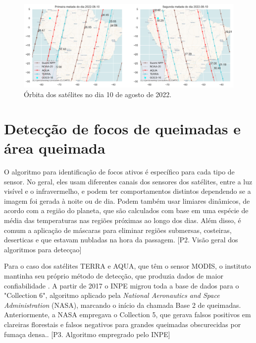 \documentclass[cic,tc]{iiufrgs}
\begin{document}
\begin{figure}[H]
    \caption{Órbita dos satélites no dia 10 de agosto de 2022.}
    \begin{center}
        \includegraphics[width=35em]{orbita2022-08-10}
    \end{center}
    \label{fig:orbita2022-08-10}
\end{figure}

\section{Detecção de focos de queimadas e área queimada}
\label{deteccao_focos_section}

O algoritmo para identificação de focos ativos é específico para cada tipo de sensor. No geral, eles usam diferentes canais dos sensores dos satélites, entre a luz visível e o infravermelho, e podem ter comportamentos distintos dependendo se a imagem foi gerada à noite ou de dia. Podem também usar limiares dinâmicos, de acordo com a região do planeta, que são calculados com base em uma espécie de média das temperaturas nas regiões próximas ao longo dos dias. Além disso, é comum a aplicação de máscaras para eliminar regiões submersas, costeiras, deserticas e que estavam nubladas na hora da passagem. [P2. Visão geral dos algoritmos para detecçao] \par

Para o caso dos satélites TERRA e AQUA, que têm o sensor MODIS, o instituto mantinha seu próprio método de detecção, que produzia dados de maior confiabilidade \citep{PerguntasFrequentesINPE}. A partir de 2017 o INPE migrou toda a base de dados para o "Collection 6", algoritmo aplicado pela \textit{National Aeronautics and Space Administration} (NASA), marcando o início da chamada Base 2 de queimadas. Anteriormente, a NASA empregava o Collection 5, que gerava falsos positivos em clareiras florestais e falsos negativos para grandes queimadas obscurecidas por fumaça densa.\citep{SCHROEDER2008}. [P3. Algoritmo empregrado pelo INPE] \par
\end{document}
